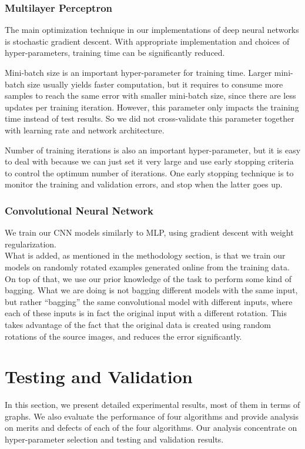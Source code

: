\documentclass{acm_proc_article-sp}
\begin{document}
\subsubsection{Multilayer Perceptron}
The main optimization technique in our implementations of deep neural networks is stochastic gradient descent. With appropriate implementation and choices of hyper-parameters, training time can be significantly reduced.

Mini-batch size is an important hyper-parameter for training time. Larger mini-batch size usually yields faster computation, but it requires to consume more samples to reach the same error with smaller mini-batch size, since there are less updates per training iteration. However, this parameter only impacts the training time instead of test results. So we did not cross-validate this parameter together with learning rate and network architecture. 

Number of training iterations is also an important hyper-parameter, but it is easy to deal with because we can just set it very large and use early stopping criteria to control the optimum number of iterations. One early stopping technique is to monitor the training and validation errors, and stop when the latter goes up.  

\subsubsection{Convolutional Neural Network}
We train our CNN models similarly to MLP, using gradient descent with weight regularization.\\
What is added, as mentioned in the methodology section, is that we train our models on randomly rotated examples generated online from the training data.
On top of that, we use our prior knowledge of the task to perform some kind of bagging. What we are doing is not bagging different models with the same input, but rather ``bagging'' the same convolutional model with different inputs, where each of these inputs is in fact the original input with a different rotation. This takes advantage of the fact that the original data is created using random rotations of the source images, and reduces the error significantly.






\section{Testing and Validation}
In this section, we present detailed experimental results, most of them in terms of graphs. We also evaluate the performance of four algorithms and provide analysis on merits and defects of each of the four algorithms. Our analysis concentrate on hyper-parameter selection and testing and validation results.
\end{document}
